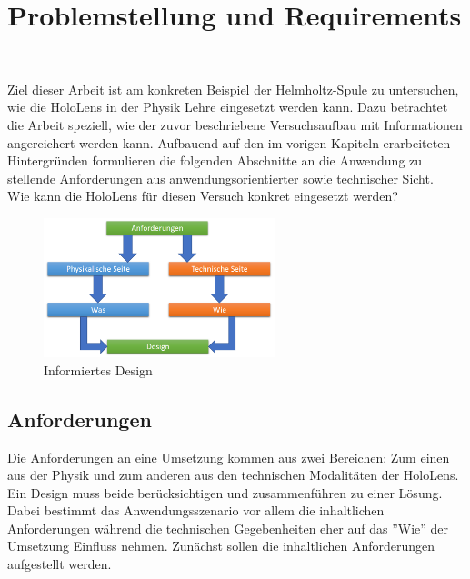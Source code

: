 \section{Problemstellung und Requirements}
\label{sec-3}
\begin{center}
	\\
\end{center}
Ziel dieser Arbeit ist am konkreten Beispiel der Helmholtz-Spule zu untersuchen, wie die HoloLens in der Physik Lehre eingesetzt werden kann. Dazu betrachtet die Arbeit speziell, wie der zuvor beschriebene Versuchsaufbau mit Informationen angereichert werden kann. Aufbauend auf den im vorigen Kapiteln erarbeiteten Hintergründen formulieren die folgenden Abschnitte an die Anwendung zu stellende Anforderungen aus anwendungsorientierter sowie technischer Sicht.\\

Wie kann die HoloLens für diesen Versuch konkret eingesetzt werden?\\

\begin{figure}[h!]
	\centering
	\includegraphics[width=0.6\textwidth]{images/Informiertes_Design.png}
	\caption{Informiertes Design}
	\label{img:Informiertes_Design}
\end{figure}

\subsection{Anforderungen}
\label{sec-3-1}
Die Anforderungen an eine Umsetzung kommen aus zwei Bereichen: Zum einen aus der Physik und zum anderen aus den technischen Modalitäten der HoloLens. Ein Design muss beide berücksichtigen und zusammenführen zu einer Lösung. Dabei bestimmt das Anwendungsszenario vor allem die inhaltlichen Anforderungen während die technischen Gegebenheiten eher auf das ''Wie'' der Umsetzung Einfluss nehmen. Zunächst sollen die inhaltlichen Anforderungen aufgestellt werden.

